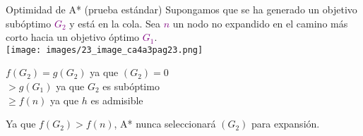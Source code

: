 \begin{frame}{Optimidad de A* (prueba estándar)}
Supongamos que se ha generado un objetivo subóptimo \textcolor{purple}{$G_{2}$} y está en la cola. Sea \textcolor{purple}{$n$} un nodo no expandido en el camino más corto hacia un objetivo óptimo \textcolor{purple}{$G_{1}$}. \\
\centering
\texttt{[image: images/23\_image\_ca4a3pag23.png]}
 \begin{flushleft}
$f(G_{2}) = g(G_{2})$ ya que $(G_{2}) = 0$\\
\hspace{1cm}$> g(G_{1})$ ya que $G_{2}$ es subóptimo\\
\hspace{1cm}$\geq f(n)$ ya que $h$ es admisible\\
\vspace{5mm}
\end{flushleft}
Ya que $f(G_{2})> f(n)$, A* nunca seleccionará $(G_{2})$ para expansión.
\end{frame}